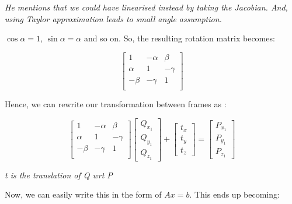 \textit{He mentions that we could have linearised instead by taking the Jacobian. And, using Taylor approximation leads to small angle assumption.}

$\cos \alpha = 1$, $\sin \alpha = \alpha$ and so on. So, the resulting rotation matrix becomes:

\begin{equation}
\begin{bmatrix}
1 & -\alpha & \beta \\
\alpha & 1 & -\gamma \\
-\beta & -\gamma & 1\\
\end{bmatrix}
\end{equation}

Hence, we can rewrite our transformation between frames as :

\begin{equation}
\begin{bmatrix}
1 & -\alpha & \beta \\
\alpha & 1 & -\gamma \\
-\beta & -\gamma & 1\\
\end{bmatrix} \begin{bmatrix}Q_{x_1} \\ Q_{y_1} \\ Q_{z_1}\end{bmatrix} + \begin{bmatrix}t_x \\ t_y \\ t_z\end{bmatrix} = \begin{bmatrix} P_{x_1} \\ P_{y_1} \\ P_{z_1} \end{bmatrix}
\end{equation}

\textit{t is the translation of Q wrt P}

Now, we can easily write this in the form of $Ax=b$. This ends up becoming:

